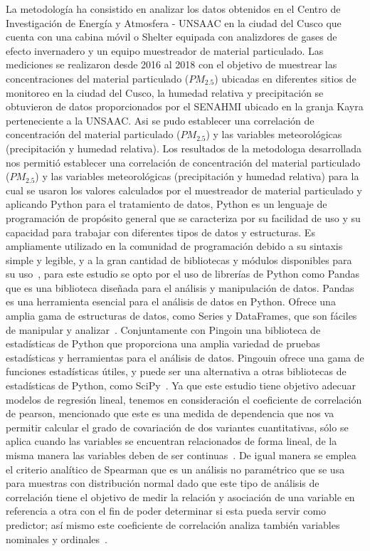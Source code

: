 \documentclass[a4paper,11pt]{article}
\begin{document}
La metodología ha consistido en analizar los datos obtenidos en el Centro de Investigación de Energía y Atmosfera - UNSAAC en la ciudad del Cusco que cuenta con una cabina móvil o Shelter equipada con analizdores de gases de efecto invernadero y un equipo muestreador de material particulado. Las mediciones se realizaron desde 2016 al 2018 con el objetivo de muestrear las concentraciones del material particulado ($PM_{2.5}$) ubicadas en diferentes sitios de monitoreo en la ciudad del Cusco, la humedad relativa y precipitación
se obtuvieron de datos proporcionados por el SENAHMI ubicado en la granja Kayra perteneciente a la UNSAAC. Asi se pudo establecer una correlación de concentración del material particulado ($PM_{2.5}$) y las variables meteorológicas (precipitación y humedad relativa). Los resultados de la metodologıa desarrollada nos permitió establecer una correlación de concentración del material particulado ($PM_{2.5}$) y las variables meteorológicas (precipitación y humedad relativa) para la cual se usaron los valores calculados por el muestreador de material particulado y aplicando Python para el tratamiento de datos, Python es un lenguaje de programación de propósito general que se caracteriza por su facilidad de uso y su capacidad para trabajar con diferentes tipos de datos y estructuras. Es ampliamente utilizado en la comunidad de programación debido a su sintaxis simple y legible, y a la gran cantidad de bibliotecas y módulos disponibles para su uso~\cite{van1995python}, para este estudio se opto por el uso de librerías de Python como Pandas que es una biblioteca diseñada para el análisis y manipulación de datos. Pandas es una herramienta esencial para el análisis de datos en Python. Ofrece una amplia gama de estructuras de datos, como Series y DataFrames, que son fáciles de manipular y analizar~\cite{mckinney2010data}. Conjuntamente con Pingoin una biblioteca de estadísticas de Python que proporciona una amplia variedad de pruebas estadísticas y herramientas para el análisis de datos. Pingouin ofrece una gama de funciones estadísticas útiles, y puede ser una alternativa a otras bibliotecas de estadísticas de Python, como SciPy~\cite{vallat2018pingouin}. Ya que este estudio tiene objetivo adecuar modelos de regresión lineal, tenemos en consideración el coeficiente de correlación de pearson, mencionado que este es una medida de dependencia que nos va permitir calcular el grado de covariación de dos variantes cuantitativas, sólo se aplica cuando las variables se encuentran relacionados de forma lineal, de la misma manera las variables deben de ser continuas~\cite{Dagnino_2014}. De igual manera se emplea el criterio analítico de Spearman que es un análisis no paramétrico que se usa para muestras con distribución normal dado que este tipo de análisis de correlación tiene el objetivo de medir la relación y asociación de una variable en referencia a otra con el fin de poder determinar si esta pueda servir como predictor; así mismo este coeficiente de correlación analiza también variables nominales y ordinales~\cite{barrera2014uso}.
\end{document}
